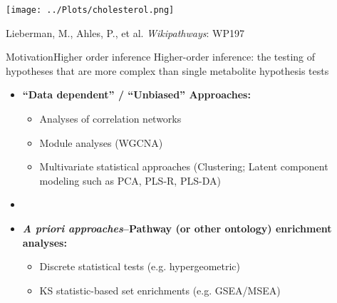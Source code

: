 \documentclass[xcolor=dvipsnames]{beamer}
\begin{document}
\begin{frame}
	\begin{center}
		\texttt{[image: ../Plots/cholesterol.png]}
		
		Lieberman, M., Ahles, P., et al. \emph{Wikipathways}: WP197
	\end{center}
\end{frame}

\begin{frame}{Motivation}{Higher order inference}
	\vspace{-10pt}
	{\Large Higher-order inference: the testing of hypotheses that are more complex than single metabolite hypothesis tests} \vspace{7pt} \pause
	
	\begin{itemize}
		\item \textbf{``Data dependent'' / ``Unbiased'' Approaches:} 
		\begin{itemize}
		\item Analyses of correlation networks
		\item Module analyses (WGCNA)
		\item Multivariate statistical approaches (Clustering; Latent component modeling such as PCA, PLS-R, PLS-DA) \pause
		\end{itemize}
		\item[]
		\item \textbf{\emph{A priori approaches}--Pathway (or other ontology) enrichment analyses:} 
		\begin{itemize}
			\item Discrete statistical tests (e.g. hypergeometric)
			\item KS statistic-based set enrichments (e.g. GSEA/MSEA)
		\end{itemize}
	\end{itemize}
	
\end{frame}
\end{document}

